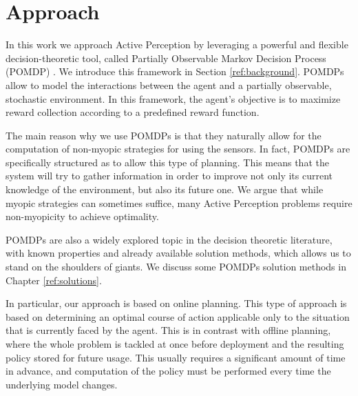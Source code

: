 \section{Approach}

In this work we approach Active Perception by leveraging a powerful and flexible decision-theoretic
tool, called Partially Observable Markov Decision Process (POMDP) \cite{cit:pomdp}. We introduce
this framework in Section \ref{ref:background}. POMDPs allow to model the interactions between the
agent and a partially observable, stochastic environment.  In this framework, the agent's objective
is to maximize reward collection according to a predefined reward function.

The main reason why we use POMDPs is that they naturally allow for the computation of non-myopic
strategies for using the sensors. In fact, POMDPs are specifically structured as to allow this type
of planning. This means that the system will try to gather information in order to improve not only
its current knowledge of the environment, but also its future one. We argue that while myopic
strategies can sometimes suffice, many Active Perception problems require non-myopicity to achieve
optimality.


POMDPs are also a widely explored topic in the decision theoretic literature, with known properties
and already available solution methods, which allows us to stand on the shoulders of giants. We
discuss some POMDPs solution methods in Chapter \ref{ref:solutions}.


In particular, our approach is based on online planning. This type of approach is based on
determining an optimal course of action applicable only to the situation that is currently faced by
the agent. This is in contrast with offline planning, where the whole problem is tackled at once
before deployment and the resulting policy stored for future usage. This usually requires a
significant amount of time in advance, and computation of the policy must be performed every time
the underlying model changes.

